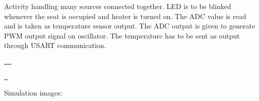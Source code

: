 Activity handling many sources connected together. LED is to be blinked whenever the seat is occupied and heater is turned on. The ADC value is read and is taken as temperature sensor output. The ADC output is given to generate PWM output signal on oscillator. The temperature has to be sent as output through USART communication.

\href{https://app.codacy.com/gh/ShreyaGP/EmbeddedC?utm_source=github.com&utm_medium=referral&utm_content=ShreyaGP/EmbeddedC&utm_campaign=Badge_Grade_Settings}{\texttt{ }} \href{https://github.com/ShreyaGP/EmbeddedC/actions/workflows/compile.yml}{\texttt{ }}

\href{https://github.com/ShreyaGP/EmbeddedC/actions/workflows/code_quality.yml}{\texttt{ }}

Simulation images\+:





 